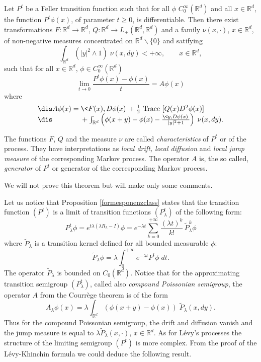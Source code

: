 \documentclass[preprint]{imsart}
\def\R{\mathbb R}
\begin{document}
{\begin{Theorem}\label{courrege}
Let $P^t$ be a Feller transition function such that
for all $\phi$ $C_0^\infty (\R^d)$ and all $x\in\R^d$, the function
$P^t\phi(x)$, of parameter $t\geq 0$, is differentiable.
Then there exist
transformations $F:\R^d\to\R^d$, $Q:\R^d\to L_+(\R^d,\R^d)$ and
a family $\nu(x,\cdot)$, $x\in\R^d$, of non-negative
measures concentrated on
$\R^d\backslash \{0\}$ and satifying
$$
\int_{\R^d} (|y|^2\wedge 1)\; \nu (x,dy)<+\infty,
\qquad x\in\R^d,
$$
such that for all $ x\in\R^d$, $\phi\in C_0^\infty (\R^d)$
$$
\lim_{t\to 0} \frac{P^t\phi(x)-\phi(x)}{t}
= A\phi(x)
$$
where
$$\begin{array}{l}\dis
 A\phi(x)= \<F(x),D\phi(x)\> +\frac{1}{2}{\rm \ Trace}\
 [Q(x)D^2\phi(x)]
 \\\dis
 \qquad\qquad+ \int_{\R^d} \left(
 \phi(x+y)-\phi(x)-\frac{\<y,D\phi(x)\>}{|y|^2+ 1}
 \right)\; \nu(x,dy).
 \end{array}
 $$
\end{Theorem}

The functions $F$, $Q$ and the measure $\nu$ are called
{\it characteristics} of $P^t$ or of the process.
They have interpretations as {\it local drift, local diffusion} and
{\it local jump measure} of the corresponding Markov process. The operator $A$ is, the
so called, {\it generator} of $P^t$ or generator of the corresponding Markov process.

We will not prove this theorem but will make only some comments.

Let us notice that Proposition
\ref{formesponenzclass} states that
the transition function $(P^t)$ is a
limit of transition functions $(P^t_\lambda)$ of the following
form:
$$
P^t_\lambda\phi = e^{t\lambda \left(\lambda R_\lambda
-I\right)}\phi=
e^{-\lambda t} \sum_{k=0}^{+\infty}
\frac{(\lambda t)^k}{k!}\, \widetilde{P}_\lambda^k\phi
$$
where $\widetilde{P}_\lambda$ is a transition kernel defined for
all bounded measurable $\phi$:
$$
\widetilde{P}_\lambda\phi
= \lambda\int_0^{+\infty} e^{-\lambda t}P^t\phi\; dt.
$$
The operator $\widetilde{P}_\lambda$ is bounded on
$C_0(\R^d)$.
Notice that for the approximating transition semigroup
$(P^t_\lambda)$, called also {\it compound Poissonian semigroup},
the operator $A$ from the Courr\`ege theorem is of the form
$$
A_\lambda \phi(x)=
\lambda \int_{\R^d} \left(
 \phi(x+y)-\phi(x) \right)\; \widetilde{P}_\lambda(x,dy).
$$
Thus for the compound Poissonian semigroup, the drift  and
diffusion vanish and the jump measure is equal to
$\lambda\widetilde{P}_\lambda(x,\cdot)$, $x\in\R^d$.
As for L\'evy's processes the structure of the limiting semigroup
$(P^t)$ is more complex. From the proof of the
L\'evy-Khinchin formula we could deduce the following result.

}
\end{document}
